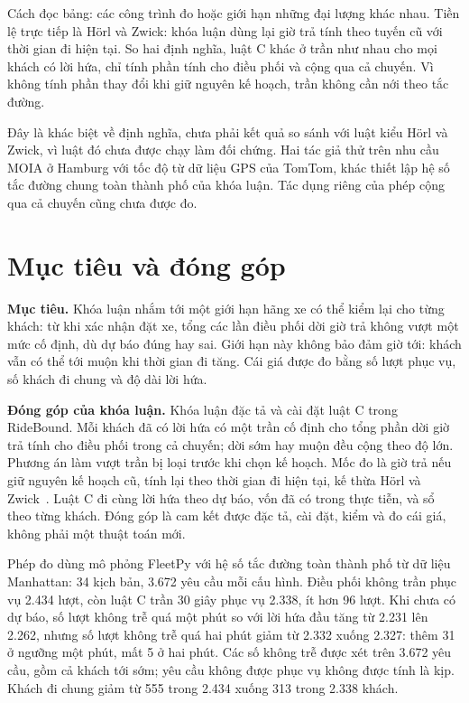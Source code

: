 Cách đọc bảng: các công trình đo hoặc giới hạn những đại lượng khác nhau. Tiền lệ trực tiếp là Hörl và
Zwick: khóa luận dùng lại giờ trả tính theo tuyến cũ với thời gian đi hiện tại. So hai định nghĩa, luật C
khác ở trần như nhau cho mọi khách có lời hứa, chỉ tính phần tính cho điều phối và cộng qua cả chuyến.
Vì không tính phần thay đổi khi giữ nguyên kế hoạch, trần không cần nới theo tắc đường.

Đây là khác biệt về định nghĩa, chưa phải kết quả so sánh với luật kiểu Hörl và Zwick, vì luật đó chưa được
chạy làm đối chứng. Hai tác giả thử trên nhu cầu MOIA ở Hamburg với tốc độ từ dữ liệu GPS của TomTom,
khác thiết lập hệ số tắc đường chung toàn thành phố của khóa luận. Tác dụng riêng của phép cộng qua cả
chuyến cũng chưa được đo.

\section{Mục tiêu và đóng góp}
\label{muc:c1-donggop}

\noindent\textbf{Mục tiêu.} Khóa luận nhắm tới một giới hạn hãng xe có thể kiểm lại cho từng khách: từ khi
xác nhận đặt xe, tổng các lần điều phối dời giờ trả không vượt một mức cố định, dù dự báo đúng hay sai.
Giới hạn này không bảo đảm giờ tới: khách vẫn có thể tới muộn khi thời gian đi tăng. Cái giá được đo bằng
số lượt phục vụ, số khách đi chung và độ dài lời hứa.

\noindent\textbf{Đóng góp của khóa luận.} Khóa luận đặc tả và cài đặt luật C trong RideBound. Mỗi khách đã
có lời hứa có một trần cố định cho tổng phần dời giờ trả tính cho điều phối trong cả chuyến; dời sớm hay
muộn đều cộng theo độ lớn. Phương án làm vượt trần bị loại trước khi chọn kế hoạch. Mốc đo là giờ trả nếu
giữ nguyên kế hoạch cũ, tính lại theo thời gian đi hiện tại, kế thừa Hörl và Zwick~\cite{horl2022}.
Luật C đi cùng lời hứa theo dự báo, vốn đã có trong thực tiễn, và sổ theo từng khách. Đóng góp là cam kết
được đặc tả, cài đặt, kiểm và đo cái giá, không phải một thuật toán mới.

Phép đo dùng mô phỏng FleetPy với hệ số tắc đường toàn thành phố từ dữ liệu Manhattan: 34 kịch bản,
3.672 yêu cầu mỗi cấu hình. Điều phối không trần phục vụ 2.434 lượt, còn luật C trần 30 giây phục vụ
2.338, ít hơn 96 lượt. Khi chưa có dự báo, số lượt không trễ quá một phút so với lời hứa đầu tăng từ
2.231 lên 2.262, nhưng số lượt không trễ quá hai phút giảm từ 2.332 xuống 2.327: thêm 31 ở ngưỡng một
phút, mất 5 ở hai phút. Các số không trễ được xét trên 3.672 yêu cầu, gồm cả khách tới sớm; yêu cầu không
được phục vụ không được tính là kịp. Khách đi chung giảm từ 555 trong 2.434 xuống 313 trong 2.338 khách.

